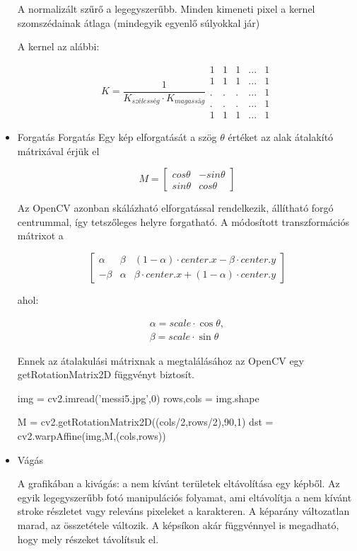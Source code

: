 \begin{itemize}
A normalizált szűrő a legegyszerűbb. Minden kimeneti pixel a kernel szomszédainak átlaga (mindegyik egyenlő súlyokkal jár)

A kernel az alábbi:

\[K = \dfrac{1}{K_{szélesség} \cdot K_{magasság}}
\begin{matrix}
    1 & 1 & 1 & ... & 1 \\
    1 & 1 & 1 & ... & 1 \\
    . &. &. & ... & 1 \\
    . &. &. & ... & 1 \\
    1 & 1 & 1 & ... & 1   
\end{matrix}
\]
\item Forgatás
Forgatás
Egy kép elforgatását a szög $\theta$ értéket az alak átalakító mátrixával érjük el

$$M = \begin{bmatrix} cos\theta & -sin\theta \\ sin\theta & cos\theta   \end{bmatrix}$$

Az OpenCV azonban skálázható elforgatással rendelkezik, állítható forgó centrummal, így tetszőleges helyre forgatható. A módosított transzformációs mátrixot a

$$\begin{bmatrix}
\alpha &  \beta & (1- \alpha )  \cdot center.x -  \beta \cdot center.y \\ - \beta &  \alpha &  \beta \cdot center.x + (1- \alpha )  \cdot center.y
\end{bmatrix}$$

ahol:

$$\begin{array}{l}
\alpha =  scale \cdot \cos \theta , \\ \beta =  scale \cdot \sin \theta
\end{array}$$

Ennek az átalakulási mátrixnak a megtalálásához az OpenCV egy getRotationMatrix2D függvényt biztosít.

\begin{python}
img = cv2.imread('messi5.jpg',0)
rows,cols = img.shape

M = cv2.getRotationMatrix2D((cols/2,rows/2),90,1)
dst = cv2.warpAffine(img,M,(cols,rows))
\end{python}

\item Vágás

A grafikában a kivágás: a nem kívánt területek eltávolítása egy képből. Az egyik legegyszerűbb fotó manipulációs folyamat, ami eltávolítja a nem kívánt stroke részletet vagy releváns pixeleket a karakteren. A képarány változatlan marad, az összetétele változik. A képsíkon akár függvénnyel is megadható, hogy mely részeket távolítsuk el.


\end{itemize}
